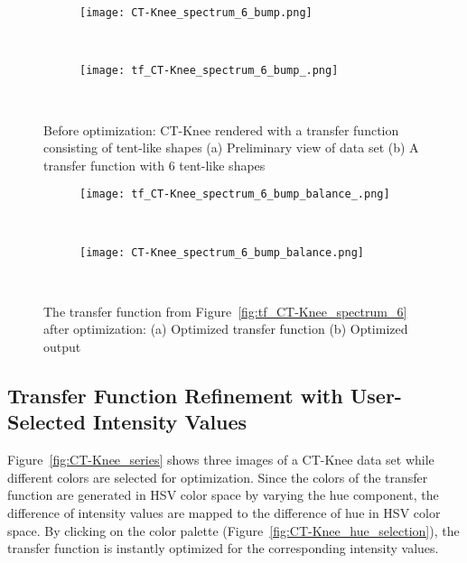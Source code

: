 \begin{figure}
\centering

\begin{subfigure}{0.15\textwidth}
\texttt{[image: CT-Knee\_spectrum\_6\_bump.png]}
\caption{~}
\end{subfigure}
\begin{subfigure}{0.15\textwidth}
\texttt{[image: tf\_CT-Knee\_spectrum\_6\_bump\_.png]}
\caption{~}
\label{fig:tf_CT-Knee_spectrum_6_bump_}
\end{subfigure}
\caption{Before optimization: CT-Knee rendered with a transfer function consisting 
of tent-like shapes (a) Preliminary view of data set (b) A transfer function with 6 tent-like shapes}
\label{fig:tf_CT-Knee_spectrum_6}

\begin{subfigure}{0.15\textwidth}
\texttt{[image: tf\_CT-Knee\_spectrum\_6\_bump\_balance\_.png]}
\caption{~}
\end{subfigure}
\begin{subfigure}{0.15\textwidth}
\texttt{[image: CT-Knee\_spectrum\_6\_bump\_balance.png]}
\caption{~}
\end{subfigure}
\caption{The transfer function from Figure~\ref{fig:tf_CT-Knee_spectrum_6} after optimization: (a) Optimized transfer function (b) Optimized output}
\label{fig:tf_CT-Knee_spectrum_6_balance_1000}
\end{figure}

\subsection{Transfer Function Refinement with User-Selected Intensity Values}
Figure~\ref{fig:CT-Knee_series} shows three images of a CT-Knee data set while different colors are selected for optimization. Since the colors of the transfer function are generated in HSV color space by varying the hue component, the difference of intensity values are mapped to the difference of hue in HSV color space. By clicking on the color palette (Figure~\ref{fig:CT-Knee_hue_selection}), the transfer function is instantly optimized for the corresponding intensity values.

